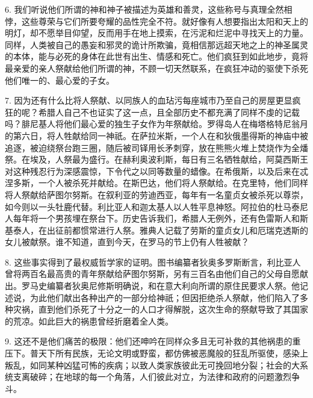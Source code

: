6. 我们听说他们所谓的神和神子被描述为英雄和善灵，这些称号与真理全然相悖，这些尊荣与它们所要夸耀的品性完全不符。就好像有人想要指出太阳和天上的明灯，却不愿举目仰望，反而用手在地上摸索，在污泥和烂泥中寻找天上的力量。同样，人类被自己的愚妄和邪灵的诡计所欺骗，竟相信那远超天地之上的神圣属灵的本体，能与必死的身体在此世有出生、情感和死亡。他们疯狂到如此地步，竟将最亲爱的亲人祭献给他们所谓的神，不顾一切天然联系，在疯狂冲动的驱使下杀死他们唯一的、最心爱的子女。\par

7. 因为还有什么比将人祭献、以同族人的血玷污每座城市乃至自己的房屋更显疯狂的呢？希腊人自己不也证实了这一点，且全部历史不都充满了同样不虔的记载吗？腓尼基人将他们最心爱的独生子女作为年祭献给。罗得岛人在梅塔格特尼翁月的第六日，将人牲献给同一神祇。在萨拉米斯，一个人在和狄俄墨得斯的神庙中被追逐，被迫绕祭台跑三圈，随后被司铎用长矛刺穿，放在熊熊火堆上焚烧作为全燔祭。在埃及，人祭最为盛行。在赫利奥波利斯，每日有三名牺牲献给，阿莫西斯王对这种残忍行为深感震惊，下令代之以同等数量的蜡像。在希俄斯，以及后来在忒涅多斯，一个人被杀死并献给。在斯巴达，他们将人祭献给。在克里特，他们同样将人祭献给萨图尔努斯。在叙利亚的劳迪西亚，每年有一名童贞女被杀死以尊崇，如今则以一头牡鹿代替。利比亚人和迦太基人以人牲平息神怒。阿拉伯的杜马泰尼人每年将一个男孩埋在祭台下。历史告诉我们，希腊人无例外，还有色雷斯人和斯基泰人，在出征前都惯常进行人祭。雅典人记载了劳斯的童贞女儿和厄瑞克透斯的女儿被献祭。谁不知道，直到今天，在罗马的节上仍有人牲被献？\par

8. 这些事实得到了最权威哲学家的证明。图书编纂者狄奥多罗斯断言，利比亚人曾将两百名最高贵的青年祭献给萨图尔努斯，另有三百名由他们自己的父母自愿献出。罗马史编纂者狄奥尼修斯明确说，和在意大利向所谓的原住民要求人祭。他记述说，为此他们献出各种出产的一部分给神祇；但因拒绝杀人祭献，他们陷入了多种灾祸，直到他们杀死了十分之一的人口才得解脱，这次生命的祭献导致了其国家的荒凉。如此巨大的祸患曾经折磨着全人类。\par

9. 这还不是他们痛苦的极限：他们还呻吟在同样众多且无可补救的其他祸患的重压下。普天下所有民族，无论文明或野蛮，都仿佛被恶魔般的狂乱所驱使，感染上叛乱，如同某种凶猛可怖的疾病；以致人类家族彼此无可挽回地分裂；社会的大系统支离破碎；在地球的每一个角落，人们彼此对立，为法律和政府的问题激烈争斗。\par

